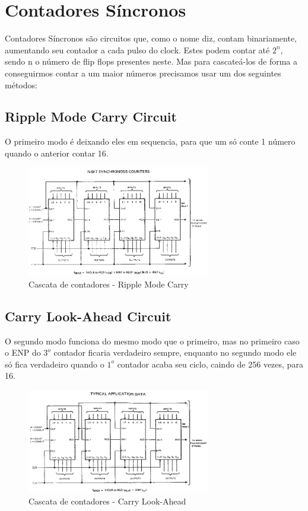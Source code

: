\documentclass{article}
\begin{document}
    \section{Contadores Síncronos}
        Contadores Síncronos são circuitos que, como o nome diz, 
        contam binariamente, aumentando seu contador a cada pulso do clock. 
        Estes podem contar até $2^n$, sendo n o número de flip flops presentes neste.
        \newline
        Mas para cascateá-los de forma a conseguirmos contar a um maior números precisamos usar um dos seguintes métodos:

        \subsection{Ripple Mode Carry Circuit}
            O primeiro modo é deixando eles em sequencia, 
            para que um só conte 1 número quando o anterior contar 16.
            \begin{figure} [H] 
                \includegraphics[width=8cm]{counter-cascading-01.png}
                \caption{Cascata de contadores - Ripple Mode Carry}
                \label{fig:counter-cascading-01}
            \end{figure}

        \subsection{Carry Look-Ahead Circuit}
            O segundo modo funciona do mesmo modo que o primeiro, 
            mas no primeiro caso o ENP do $3^o$ contador ficaria verdadeiro sempre, 
            enquanto no segundo modo ele só fica verdadeiro quando o $1^o$ contador acaba seu ciclo,
            caindo de 256 vezes, para 16.
            \begin{figure} [H] 
                \includegraphics[width=8cm]{counter-cascading-02.png}
                \caption{Cascata de contadores - Carry Look-Ahead}
                \label{fig:counter-cascading-02}
            \end{figure}
\end{document}
